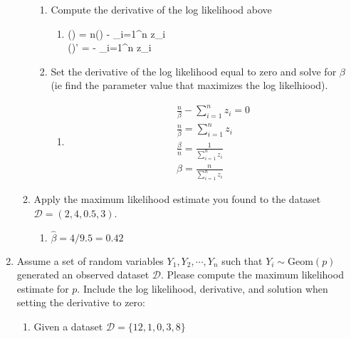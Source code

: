 \documentclass[krantz1,ChapterTOCs]{krantz}
\begin{document}
\begin{enumerate}
\begin{enumerate}
\begin{enumerate}
        \item Compute the derivative of the log likelihood above
        \begin{enumerate}
            \item  {\color{red}
            \ell \ell(\beta) = n\log(\beta) - \beta \sum_{i=1}^{n} z_{i}\\
            \ell \ell(\beta)' =  - \sum_{i=1}^{n} z_{i}
            }
        \end{enumerate}
        
        \item Set the derivative of the log likelihood equal to zero and solve for 
        $\beta$ (ie find the parameter value that maximizes the log likelhiood). 
        \begin{enumerate}
            \item  {\color{red} 
            \begin{align}
            \frac{n}{\beta} - \sum_{i=1}^{n} z_{i} = 0\\
            \frac{n}{\beta}  = \sum_{i=1}^{n} z_{i}\\
            \frac{\beta}{n}  = \frac{1}{\sum_{i=1}^{n} z_{i}}\\
            \beta = \frac{n}{\sum_{i=1}^{n} z_{i}}
            \end{align}
            }
        \end{enumerate}
        \end{enumerate}
        
        \item Apply the maximum likelihood estimate you found to the dataset  $\mathcal{D} = (2,4,0.5,3)$.
        \begin{enumerate}
            \item  {\color{red}$\hat{\beta} = 4/9.5 = 0.42$}
        \end{enumerate}
        
    \end{enumerate}
 
    \item  Assume a set of random variables $Y_{1}, Y_{2}, \cdots, Y_{n}$ such that $Y_{i} \sim \text{Geom}(p)$ generated an observed dataset $\mathcal{D}$. Please compute the maximum likelihood estimate for $p$. Include the log likelihood, derivative, and solution when setting the derivative to zero: 
    \begin{enumerate}
         \item Given a dataset $\mathcal{D} = \{ 12, 1, 0, 3, 8  \}$
        

\end{enumerate}
\end{enumerate}
\end{document}
